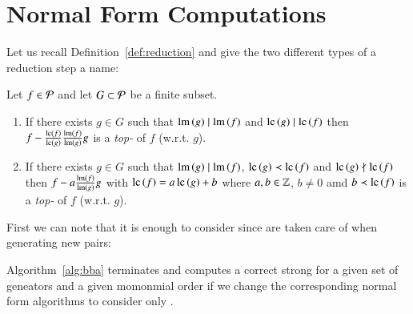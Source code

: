 \section{Normal Form Computations}
\label{sec:nf}
Let us recall Definition~\ref{def:reduction} and give the two different
types of a reduction step a name:

\begin{definition}
Let $f \in \mathcal{P}$ and let $G \subset \mathcal{P}$ be a finite subset.
\begin{enumerate}
\item If there exists $g\in G$ such that $\operatorname{lm}\left({g}\right) \mid \operatorname{lm}\left({f}\right)$ and $\mathrm{lc}\left({g}\right) \mid \mathrm{lc}\left({f}\right)$ then $f - \frac{\mathrm{lc}\left({f}\right)}{\mathrm{lc}\left({g}\right)} \frac{\operatorname{lm}\left({f}\right)}{\operatorname{lm}\left({g}\right)} g$ is a \emph{top-\ltr} of
$f$ (w.r.t. $g$).
\item If there exists $g\in G$ such that $\operatorname{lm}\left({g}\right) \mid \operatorname{lm}\left({f}\right)$, $\mathrm{lc}\left({g}\right) \prec \mathrm{lc}\left({f}\right)$ and $\mathrm{lc}\left({g}\right) \nmid \mathrm{lc}\left({f}\right)$ then $f - a \frac{\operatorname{lm}\left({f}\right)}{\operatorname{lm}\left({g}\right)} g$ with $\mathrm{lc}\left({f}\right) = a\, \mathrm{lc}\left({g}\right) + b$ where $a,b
\in \mathbb{Z}$, $b \neq 0$ amd $b \prec \mathrm{lc}\left({f}\right)$ is a \emph{top-\lcr} of $f$ (w.r.t. $g$).
\end{enumerate}
\end{definition}

First we can note that it is enough to consider \ltrs since \lcrs are taken care
of when generating new pairs:

\begin{lemma}
\label{lem:ltrs-are-enough}
Algorithm~\ref{alg:bba} terminates and computes a correct strong \stb for a
given set of geneators and a given momonmial order if we change the
corresponding normal form algorithms to consider only \ltrs.
\end{lemma}

